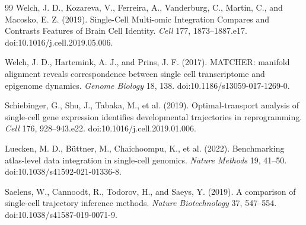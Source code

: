 \documentclass[11pt]{article}
\begin{document}
\begin{thebibliography}{99}
Welch, J. D., Kozareva, V., Ferreira, A., Vanderburg, C., Martin, C., and Macosko, E. Z. (2019).
Single-Cell Multi-omic Integration Compares and Contrasts Features of Brain Cell Identity.
\emph{Cell} 177, 1873--1887.e17.
doi:10.1016/j.cell.2019.05.006.

Welch, J. D., Hartemink, A. J., and Prins, J. F. (2017).
MATCHER: manifold alignment reveals correspondence between single cell transcriptome and epigenome dynamics.
\emph{Genome Biology} 18, 138.
doi:10.1186/s13059-017-1269-0.

Schiebinger, G., Shu, J., Tabaka, M., et al. (2019).
Optimal-transport analysis of single-cell gene expression identifies developmental trajectories in reprogramming.
\emph{Cell} 176, 928--943.e22.
doi:10.1016/j.cell.2019.01.006.

Luecken, M. D., B\"uttner, M., Chaichoompu, K., et al. (2022).
Benchmarking atlas-level data integration in single-cell genomics.
\emph{Nature Methods} 19, 41--50.
doi:10.1038/s41592-021-01336-8.

Saelens, W., Cannoodt, R., Todorov, H., and Saeys, Y. (2019).
A comparison of single-cell trajectory inference methods.
\emph{Nature Biotechnology} 37, 547--554.
doi:10.1038/s41587-019-0071-9.

\end{thebibliography}
\end{document}

